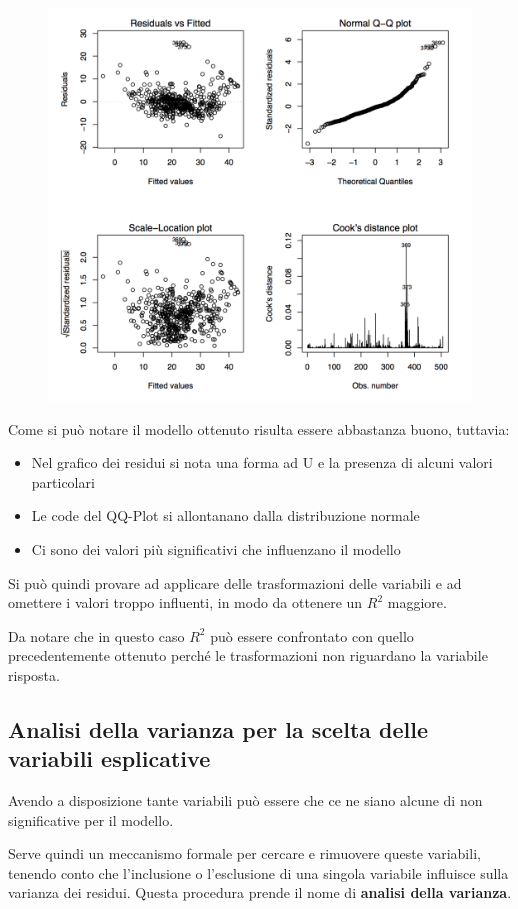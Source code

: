 \begin{figure}[htbp]
	\centering
	\includegraphics[width=.7\textwidth]{./notes/immagini/l10-fig2.png}
\end{figure}

Come si può notare il modello ottenuto risulta essere abbastanza buono, tuttavia:

\begin{itemize}
	\item Nel grafico dei residui si nota una forma ad U e la presenza di alcuni valori particolari
	\item Le code del QQ-Plot si allontanano dalla distribuzione normale
	\item Ci sono dei valori più significativi che influenzano il modello
\end{itemize}

Si può quindi provare ad applicare delle trasformazioni delle variabili e ad omettere i valori troppo influenti, in modo da ottenere un $ R^2 $ maggiore.

Da notare che in questo caso $ R^2 $ può essere confrontato con quello precedentemente ottenuto perché le trasformazioni non riguardano la variabile risposta.

\subsection{Analisi della varianza per la scelta delle variabili esplicative}

Avendo a disposizione tante variabili può essere che ce ne siano alcune di non significative per il modello.

Serve quindi un meccanismo formale per cercare e rimuovere queste variabili, tenendo conto che l'inclusione o l'esclusione di una singola variabile influisce sulla varianza dei residui. Questa procedura prende il nome di \textbf{analisi della varianza}.

